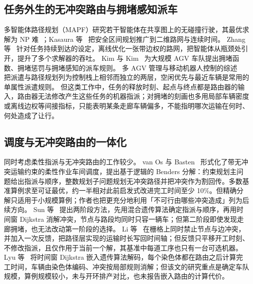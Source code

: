 \documentclass[manuscript,screen,review]{acmart}
\begin{document}
\subsection{任务外生的无冲突路由与拥堵感知派车}

多智能体路径规划（MAPF）研究若干智能体在共享图上的无碰撞行驶，其最优求解为 NP 难~\cite{gao2023mapf}；Kasaura 等~\cite{kasaura2022sipp} 把安全区间规划推广到二维路网与连续时间。
Zhang 等~\cite{zhang2024guidance} 针对任务持续到达的设定，离线优化一张带边权的路网，把智能体从瓶颈处引开，提升了多个求解器的吞吐。
Kim 与 Kim~\cite{kim2026congestion} 为大规模 AGV 车队提出拥堵函数、拥堵惩罚与拥堵感知的派车规则。
多 AGV 管理与移动机器人控制的综述~\cite{lu2022agv,fragapane2021planning} 把派遣与路径规划列为控制栈上相邻而独立的两层，空闲优先与最近车辆是常用的单属性派遣规则。
但这类工作中，任务的释放时刻、起点与终点都是路由器的输入，路由器无法修改产生这些任务的机器指派；对拥堵的刻画也多用局部车辆密度或离线边权等间接指标，只能表明某条走廊车辆偏多，不能指明哪次运输在何时、何处造成了让行。

\subsection{调度与无冲突路由的一体化}

同时考虑柔性指派与无冲突路由的工作较少。
van Os 与 Basten~\cite{vanos2026exact} 形式化了带无冲突运输约束的柔性作业车间调度，提出基于逻辑的 Benders 分解：约束规划主问题给出指派与顺序，整数规划子问题规划无冲突路径并把冲突作为割回传。多数基准算例求至可证最优，约一半相对此前启发式改进完工时间至少 10\%。但精确分解只适用于小规模算例；作者也把更充分地利用「不可行由哪些冲突造成」列为后续方向。
Sun 等~\cite{sun2023integrated} 提出两阶段方法，先用混合遗传算法确定指派与顺序，再用时间窗 Dijkstra 消解冲突，节点与路段均同时只容一辆车；但第二阶段即使发现走廊拥堵，也无法改动第一阶段的选择。
Li 等~\cite{li2026framework} 在栅格上同时禁止节点与边冲突，并加入一次反馈，把路径层实现的运输时长写回时间轴；但反馈只平移开工时刻、不修改指派，且仅作用于当前一个解，其基准中每道工序也只有一台可选机器。
Lyu 等~\cite{lyu2019approach} 将时间窗 Dijkstra 嵌入遗传算法解码，每个染色体都在路由之后计算完工时间，车辆由染色体编码、冲突按局部规则消解；但该文的研究重点是确定车队规模，算例规模较小，未与开环排产对比，也未报告嵌入路由的计算代价。
\end{document}
